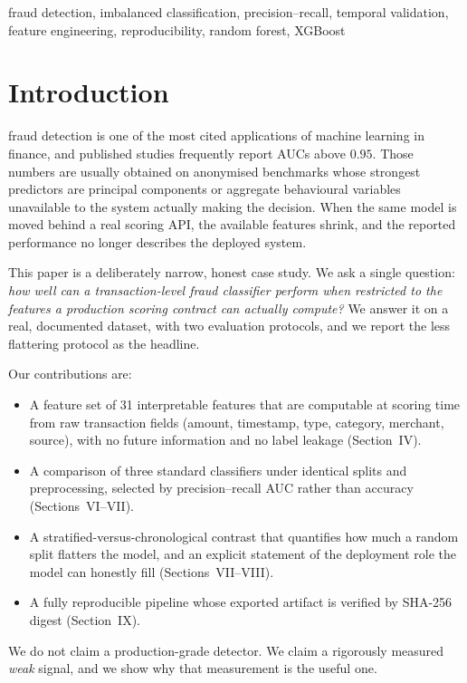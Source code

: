 \documentclass[conference]{IEEEtran}
\begin{document}
\begin{IEEEkeywords}
fraud detection, imbalanced classification, precision--recall, temporal
validation, feature engineering, reproducibility, random forest, XGBoost
\end{IEEEkeywords}

\section{Introduction}
 fraud detection is one of the most cited
applications of machine learning in finance, and published studies frequently
report AUCs above $0.95$. Those numbers are usually obtained on
anonymised benchmarks whose strongest predictors are principal components or
aggregate behavioural variables unavailable to the system actually making the
decision. When the same model is moved behind a real scoring API, the
available features shrink, and the reported performance no longer describes
the deployed system.

This paper is a deliberately narrow, honest case study. We ask a single
question: \emph{how well can a transaction-level fraud classifier perform
when restricted to the features a production scoring contract can actually
compute?} We answer it on a real, documented dataset, with two evaluation
protocols, and we report the less flattering protocol as the headline.

Our contributions are:
\begin{itemize}
\item A feature set of 31 interpretable features that are computable at
scoring time from raw transaction fields (amount, timestamp, type, category,
merchant, source), with no future information and no label leakage
(Section~IV).
\item A comparison of three standard classifiers under identical splits and
preprocessing, selected by precision--recall AUC rather than accuracy
(Sections~VI--VII).
\item A stratified-versus-chronological contrast that quantifies how much a
random split flatters the model, and an explicit statement of the deployment
role the model can honestly fill (Sections~VII--VIII).
\item A fully reproducible pipeline whose exported artifact is verified by
SHA-256 digest (Section~IX).
\end{itemize}

We do not claim a production-grade detector. We claim a rigorously measured
\emph{weak} signal, and we show why that measurement is the useful one.
\end{document}
